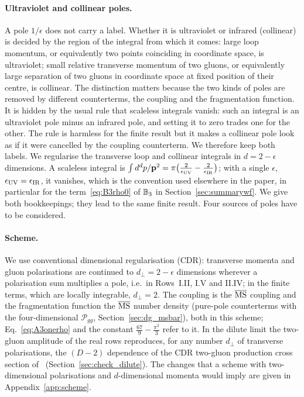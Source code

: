 \paragraph{Ultraviolet and collinear poles.} A pole $1/\epsilon$ does not carry a label. Whether it is ultraviolet or infrared (collinear) is decided by the region of the integral from which it comes: large loop momentum, or equivalently two points coinciding in coordinate space, is ultraviolet; small relative transverse momentum of two gluons, or equivalently large separation of two gluons in coordinate space at fixed position of their centre, is collinear. The distinction matters because the two kinds of poles are removed by different counterterms, the coupling and the fragmentation function. It is hidden by the usual rule that scaleless integrals vanish: such an integral is an ultraviolet pole minus an infrared pole, and setting it to zero trades one for the other. The rule is harmless for the finite result but it makes a collinear pole look as if it were cancelled by the coupling counterterm. We therefore keep both labels. We regularise the transverse loop and collinear integrals in $d=2-\epsilon$ dimensions. A scaleless integral is $\int d^dp/\mathbf{p}^2=\pi\big(\frac{2}{\epsilon_{\rm UV}}-\frac{2}{\epsilon_{\rm IR}}\big)$; with a single $\epsilon$, $\epsilon_{\rm UV}=\epsilon_{\rm IR}$, it vanishes, which is the convention used elsewhere in the paper, in particular for the term~\eqref{eq:B3rho0} of $\mathbb{B}_3$ in Section~\ref{sec:summarywf}. We give both bookkeepings; they lead to the same finite result. Four sources of poles have to be considered.

\paragraph{Scheme.} We use conventional dimensional regularisation (CDR): transverse momenta and gluon polarisations are continued to $d_\perp=2-\epsilon$ dimensions wherever a polarisation sum multiplies a pole, i.e.\ in Rows~I.II, I.V and II.IV; in the finite terms, which are locally integrable, $d_\perp=2$. The coupling is the $\overline{\rm MS}$ coupling and the fragmentation function the $\overline{\rm MS}$ number density (pure-pole counterterms with the four-dimensional $\mathcal P_{gg}$, Section~\ref{sec:dg_msbar}), both in this scheme; Eq.~\eqref{eq:A3onerho} and the constant $\frac{67}{9}-\frac{\pi^2}{3}$ refer to it. In the dilute limit the two-gluon amplitude of the real rows reproduces, for any number $d_\perp$ of transverse polarisations, the $(D-2)$ dependence of the CDR two-gluon production cross section of~\cite{Fadin:1998py,Bartels:2006hg} (Section~\ref{sec:check_dilute}). The changes that a scheme with two-dimensional polarisations and $d$-dimensional momenta would imply are given in Appendix~\ref{app:scheme}.

